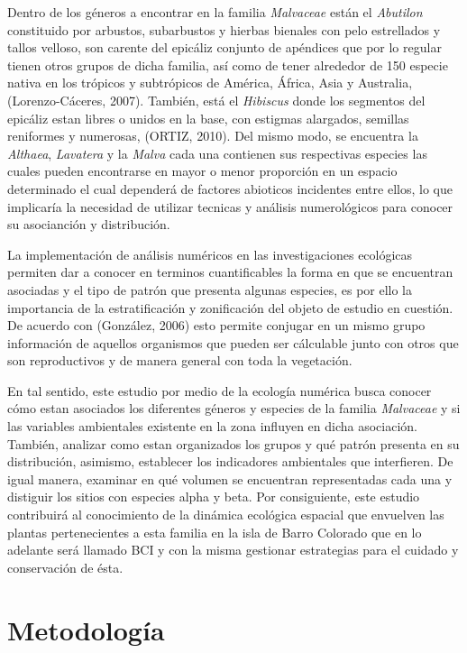 \documentclass[11pt,]{article}
\begin{document}
Dentro de los géneros a encontrar en la familia \emph{Malvaceae} están
el \emph{Abutilon} constituido por arbustos, subarbustos y hierbas
bienales con pelo estrellados y tallos velloso, son carente del epicáliz
conjunto de apéndices que por lo regular tienen otros grupos de dicha
familia, así como de tener alrededor de 150 especie nativa en los
trópicos y subtrópicos de América, África, Asia y Australia,
(Lorenzo-Cáceres, 2007). También, está el \emph{Hibiscus} donde los
segmentos del epicáliz estan libres o unidos en la base, con estigmas
alargados, semillas reniformes y numerosas, (ORTIZ, 2010). Del mismo
modo, se encuentra la \emph{Althaea}, \emph{Lavatera} y la \emph{Malva}
cada una contienen sus respectivas especies las cuales pueden
encontrarse en mayor o menor proporción en un espacio determinado el
cual dependerá de factores abioticos incidentes entre ellos, lo que
implicaría la necesidad de utilizar tecnicas y análisis numerológicos
para conocer su asocianción y distribución.

La implementación de análisis numéricos en las investigaciones
ecológicas permiten dar a conocer en terminos cuantificables la forma en
que se encuentran asociadas y el tipo de patrón que presenta algunas
especies, es por ello la importancia de la estratificación y
zonificación del objeto de estudio en cuestión. De acuerdo con
(González, 2006) esto permite conjugar en un mismo grupo información de
aquellos organismos que pueden ser cálculable junto con otros que son
reproductivos y de manera general con toda la vegetación.

En tal sentido, este estudio por medio de la ecología numérica busca
conocer cómo estan asociados los diferentes géneros y especies de la
familia \emph{Malvaceae} y si las variables ambientales existente en la
zona influyen en dicha asociación. También, analizar como estan
organizados los grupos y qué patrón presenta en su distribución,
asimismo, establecer los indicadores ambientales que interfieren. De
igual manera, examinar en qué volumen se encuentran representadas cada
una y distiguir los sitios con especies alpha y beta. Por consiguiente,
este estudio contribuirá al conocimiento de la dinámica ecológica
espacial que envuelven las plantas pertenecientes a esta familia en la
isla de Barro Colorado que en lo adelante será llamado BCI y con la
misma gestionar estrategias para el cuidado y conservación de ésta.

\section{Metodología}\label{metodologuxeda}
\end{document}
